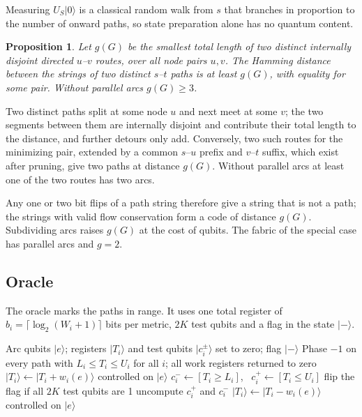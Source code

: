 \documentclass[journal]{IEEEtran}
\newtheorem{proposition}{Proposition}
\begin{document}
Measuring $U_{S}\lvert 0\rangle$ is a classical random walk from $s$ that branches in proportion to the number of onward paths, so state preparation alone has no quantum content.

\begin{proposition}\label{prop:distance}
Let $g(G)$ be the smallest total length of two distinct internally disjoint directed $u$--$v$ routes, over all node pairs $u,v$. The Hamming distance between the strings of two distinct $s$--$t$ paths is at least $g(G)$, with equality for some pair. Without parallel arcs $g(G)\ge 3$.
\end{proposition}

\begin{IEEEproof}
Two distinct paths split at some node $u$ and next meet at some $v$; the two segments between them are internally disjoint and contribute their total length to the distance, and further detours only add. Conversely, two such routes for the minimizing pair, extended by a common $s$--$u$ prefix and $v$--$t$ suffix, which exist after pruning, give two paths at distance $g(G)$. Without parallel arcs at least one of the two routes has two arcs.
\end{IEEEproof}

Any one or two bit flips of a path string therefore give a string that is not a path; the strings with valid flow conservation form a code of distance $g(G)$. Subdividing arcs raises $g(G)$ at the cost of qubits. The fabric of the special case has parallel arcs and $g=2$.

\subsection{Oracle}
\label{sec:oracle}

The oracle marks the paths in range. It uses one total register of $b_{i}=\lceil\log_{2}(W_{i}+1)\rceil$ bits per metric, $2K$ test qubits and a flag in the state $\lvert -\rangle$.

\begin{algorithm}[t]
\caption{Range-constrained Grover oracle}\label{alg:oracle}
\begin{algorithmic}[1]
\Require Arc qubits $\lvert e\rangle$; registers $\lvert T_{i}\rangle$ and test qubits $\lvert c_{i}^{\pm}\rangle$ set to zero; flag $\lvert -\rangle$
\Ensure Phase $-1$ on every path with $L_{i} \le T_{i} \le U_{i}$ for all $i$; all work registers returned to zero
    \State $\lvert T_{i}\rangle \leftarrow \lvert T_{i}+ w_{i}(e)\rangle$ controlled on $\lvert e\rangle$
\EndFor
{}
  \State $c_{i}^{-} \leftarrow [T_{i} \ge L_{i}]$, \ $c_{i}^{+} \leftarrow [T_{i} \le U_{i}]$
\EndFor
\State flip the flag if all $2K$ test qubits are 1
  \State uncompute $c_{i}^{+}$ and $c_{i}^{-}$
\EndFor
{}
    \State $\lvert T_{i}\rangle \leftarrow \lvert T_{i}- w_{i}(e)\rangle$ controlled on $\lvert e\rangle$
\EndFor
\end{algorithmic}
\end{algorithm}
\end{document}
